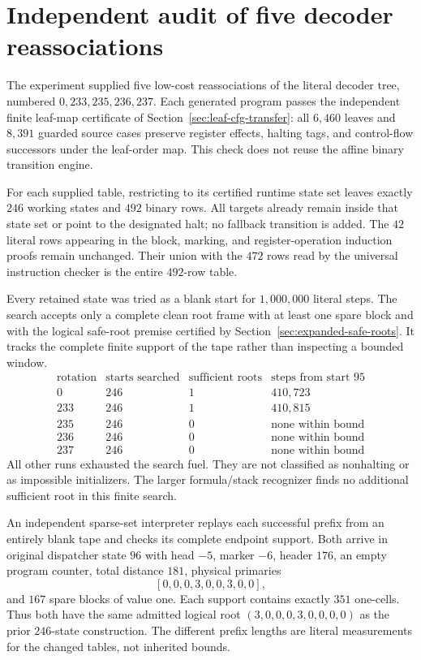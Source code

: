 \section{Independent audit of five decoder reassociations}

The experiment supplied five low-cost reassociations of the literal
decoder tree, numbered $0,233,235,236,237$.  Each generated program passes
the independent finite leaf-map certificate of
Section~\ref{sec:leaf-cfg-transfer}: all $6,460$ leaves and $8,391$ guarded
source cases preserve register effects, halting tags, and control-flow
successors under the leaf-order map.  This check does not reuse the
affine binary transition engine.

For each supplied table, restricting to its certified runtime state set
leaves exactly $246$ working states and $492$ binary rows.  All targets
already remain inside that state set or point to the designated halt;
no fallback transition is added.  The $42$ literal rows appearing in
the block, marking, and register-operation induction proofs remain
unchanged.  Their union with the $472$ rows read by the universal
instruction checker is the entire $492$-row table.

Every retained state was tried as a blank start for $1,000,000$ literal
steps.  The search accepts only a complete clean root frame with at
least one spare block and with the logical safe-root premise certified
by Section~\ref{sec:expanded-safe-roots}.  It tracks the complete finite
support of the tape rather than inspecting a bounded window.
\[
\begin{array}{c|r|r|r}
\text{rotation}&\text{starts searched}&\text{sufficient roots}&
\text{steps from start }95\\\hline
0&246&1&410{,}723\\
233&246&1&410{,}815\\
235&246&0&\text{none within bound}\\
236&246&0&\text{none within bound}\\
237&246&0&\text{none within bound}
\end{array}
\]
All other runs exhausted the search fuel.  They are not classified as
nonhalting or as impossible initializers.  The larger formula/stack
recognizer finds no additional sufficient root in this finite search.

An independent sparse-set interpreter replays each successful prefix
from an entirely blank tape and checks its complete endpoint support.
Both arrive in original dispatcher state $96$ with head $-5$, marker
$-6$, header $176$, an empty program counter, total distance $181$,
physical primaries
\[
 [0,0,0,3,0,0,3,0,0],
\]
and $167$ spare blocks of value one.  Each support contains exactly
$351$ one-cells.  Thus both have the same admitted logical root
$(3,0,0,0,3,0,0,0,0)$ as the prior $246$-state construction.
The different prefix lengths are literal measurements for the changed
tables, not inherited bounds.

